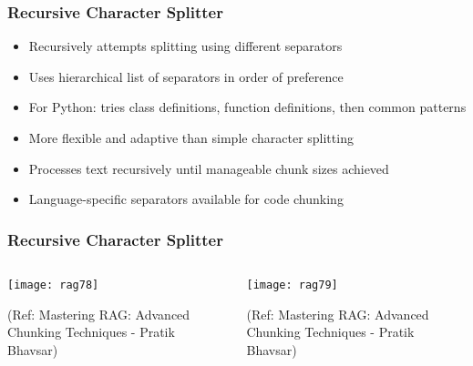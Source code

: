 \begin{frame}[fragile]\frametitle{Recursive Character Splitter}
      \begin{itemize}
\item Recursively attempts splitting using different separators
\item Uses hierarchical list of separators in order of preference
\item For Python: tries class definitions, function definitions, then common patterns
\item More flexible and adaptive than simple character splitting
\item Processes text recursively until manageable chunk sizes achieved
\item Language-specific separators available for code chunking
  \end{itemize}
\end{frame}

\begin{frame}[fragile]\frametitle{Recursive Character Splitter}

 \begin{columns}
    \begin{column}[T]{0.5\linewidth}
  	\begin{center}
	\texttt{[image: rag78]}
		
	{\tiny (Ref: Mastering RAG: Advanced Chunking Techniques - Pratik Bhavsar)}
	
	\end{center}

    \end{column}
    \begin{column}[T]{0.5\linewidth}
  	\begin{center}
	\texttt{[image: rag79]}
	
	{\tiny (Ref: Mastering RAG: Advanced Chunking Techniques - Pratik Bhavsar)}
	
	\end{center}
    \end{column}
  \end{columns}
  
\end{frame}

